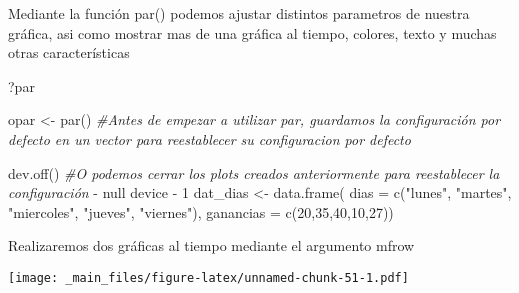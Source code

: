 \documentclass[
]{book}
\newenvironment{Shaded}{\begin{snugshade}}{\end{snugshade}}
\newcommand{\AttributeTok}[1]{\textcolor[rgb]{0.77,0.63,0.00}{#1}}
\newcommand{\CommentTok}[1]{\textcolor[rgb]{0.56,0.35,0.01}{\textit{#1}}}
\newcommand{\DecValTok}[1]{\textcolor[rgb]{0.00,0.00,0.81}{#1}}
\newcommand{\FunctionTok}[1]{\textcolor[rgb]{0.00,0.00,0.00}{#1}}
\newcommand{\NormalTok}[1]{#1}
\newcommand{\OtherTok}[1]{\textcolor[rgb]{0.56,0.35,0.01}{#1}}
\newcommand{\SpecialCharTok}[1]{\textcolor[rgb]{0.00,0.00,0.00}{#1}}
\newcommand{\StringTok}[1]{\textcolor[rgb]{0.31,0.60,0.02}{#1}}
\begin{document}
Mediante la función par() podemos ajustar distintos parametros de nuestra gráfica, asi como mostrar mas de una gráfica al tiempo, colores, texto y muchas otras características

?par

\begin{Shaded}
\begin{Highlighting}[]
\NormalTok{opar }\OtherTok{\textless{}{-}} \FunctionTok{par}\NormalTok{() }\CommentTok{\#Antes de empezar a utilizar par, guardamos la configuración por defecto en un vector para reestablecer su configuracion por defecto}

\FunctionTok{dev.off}\NormalTok{() }\CommentTok{\#O podemos cerrar los plots creados anteriormente para reestablecer la configuración}
\SpecialCharTok{{-}}\NormalTok{ null device }
\SpecialCharTok{{-}}           \DecValTok{1}
\NormalTok{dat\_dias }\OtherTok{\textless{}{-}} \FunctionTok{data.frame}\NormalTok{(}
  \AttributeTok{dias =} \FunctionTok{c}\NormalTok{(}\StringTok{"lunes"}\NormalTok{, }\StringTok{"martes"}\NormalTok{, }\StringTok{"miercoles"}\NormalTok{, }\StringTok{"jueves"}\NormalTok{, }\StringTok{"viernes"}\NormalTok{), }
  \AttributeTok{ganancias =} \FunctionTok{c}\NormalTok{(}\DecValTok{20}\NormalTok{,}\DecValTok{35}\NormalTok{,}\DecValTok{40}\NormalTok{,}\DecValTok{10}\NormalTok{,}\DecValTok{27}\NormalTok{))}
\end{Highlighting}
\end{Shaded}

Realizaremos dos gráficas al tiempo mediante el argumento mfrow

\begin{Shaded}
\end{Shaded}

\texttt{[image: \_main\_files/figure-latex/unnamed-chunk-51-1.pdf]}
\end{document}
